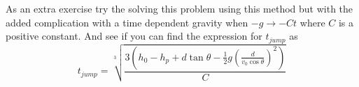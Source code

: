 \documentclass[11pt]{article}
\begin{document}
As an extra exercise try the solving this problem using this method but with the added 
complication with a time dependent gravity when $-g\rightarrow -Ct$ where $C$ is a positive
constant. And see if you can find the expression for $t_{jump}$ as
$$t_{jump} = \sqrt[3]{\frac{3\left(h_0 - h_p + d\tan\theta - \frac{1}{2}g\left(\frac{d}{v_0\cos\theta}\right)^2\right)}{C}}$$
\end{document}
